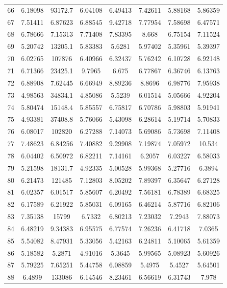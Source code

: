 \begin{center}
\begin{longtable}{cccccccc}
66 & 6.18098 & 93172.7 & 6.04108 & 6.49413 & 7.42611 & 5.88168 & 5.86359\\
67 & 7.51411 & 6.87623 & 6.88545 & 9.42718 & 7.77954 & 7.58698 & 6.47571\\
68 & 6.78666 & 7.15313 & 7.71408 & 7.83395 & 8.668 & 6.75154 & 7.11524\\
69 & 5.20742 & 13205.1 & 5.83383 & 5.6281 & 5.97402 & 5.35961 & 5.39397\\
70 & 6.02765 & 107876 & 6.40966 & 6.32437 & 5.76242 & 6.10728 & 6.92148\\
71 & 6.71366 & 23425.1 & 9.7965 & 6.675 & 6.77867 & 6.36746 & 6.13763\\
72 & 6.88908 & 7.62445 & 6.66949 & 8.89236 & 8.8696 & 6.98776 & 7.95938\\
73 & 4.98563 & 34834.1 & 4.85086 & 5.5239 & 6.01514 & 5.05666 & 4.92204\\
74 & 5.80474 & 15148.4 & 5.85557 & 6.75817 & 6.70786 & 5.98803 & 5.91941\\
75 & 4.93381 & 37408.8 & 5.76066 & 5.43098 & 6.28614 & 5.19714 & 5.70833\\
76 & 6.08017 & 102820 & 6.27288 & 7.14073 & 5.69086 & 5.73698 & 7.11408\\
77 & 7.48623 & 6.84256 & 7.40882 & 9.29908 & 7.19874 & 7.05972 & 10.534\\
78 & 6.04402 & 6.50972 & 6.82211 & 7.14161 & 6.2057 & 6.03227 & 6.58033\\
79 & 5.21598 & 18131.7 & 4.92335 & 5.00528 & 5.99368 & 5.27716 & 6.3894\\
80 & 6.21473 & 121485 & 7.12803 & 8.05202 & 7.89397 & 6.35647 & 6.27128\\
81 & 6.02357 & 6.01517 & 5.85607 & 6.20492 & 7.56181 & 6.78389 & 6.68325\\
82 & 6.17589 & 6.21922 & 5.85031 & 6.09165 & 6.46214 & 5.87716 & 6.82106\\
83 & 7.35138 & 15799 & 6.7332 & 6.80213 & 7.23032 & 7.2943 & 7.88073\\
84 & 6.48219 & 9.34383 & 6.95575 & 6.77574 & 7.26236 & 6.41718 & 7.0365\\
85 & 5.54082 & 8.47931 & 5.33056 & 5.42163 & 6.24811 & 5.10065 & 5.61359\\
86 & 5.18582 & 5.2871 & 4.91016 & 5.3645 & 5.99565 & 5.08923 & 5.60926\\
87 & 5.79225 & 7.65251 & 5.44758 & 6.08859 & 5.4975 & 5.4527 & 5.64501\\
88 & 6.4899 & 133086 & 6.14546 & 8.23461 & 6.56619 & 6.31743 & 7.978\\

\end{longtable}
\end{center}
